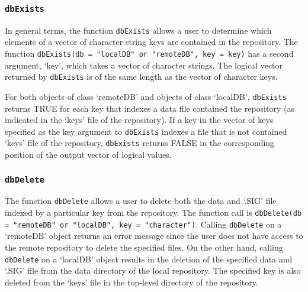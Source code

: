 \documentclass{article}
\newcommand{\code}{\texttt}
\begin{document}
\subsubsection{\code{dbExists}}

In general terms, the function \code{dbExists} allows a user to determine which 
elements of a vector of character string keys are contained in the 
repository. The function \code{dbExists(db = "localDB" or 
"remoteDB", key = key)} has a second argument, `key', which takes
a vector of character strings. The logical vector returned by \code{dbExists}
is of the same length as the vector of character keys.

For both objects of class `remoteDB' and objects of class `localDB', 
\code{dbExists} returns TRUE for each key that indexes a data file contained 
the repository (as indicated in the `keys' file of the repository).
If a key in the vector of keys specified as the key argument to \code{dbExists}
indexes a file that is not contained `keys' file of the repository,
\code{dbExists} returns FALSE in the corresponding position of the output vector
of logical values.


\subsubsection{\code{dbDelete}}

The function \code{dbDelete} allows a user to delete both the data and `.SIG' file
indexed by a particular key from the repository. The function call is 
\code{dbDelete(db = "remoteDB" or "localDB", key = "character")}. 
Calling \code{dbDelete} on a `remoteDB' object returns an error message 
since the user does not have access to the remote repository to delete the 
specified files. On the other hand, calling \code{dbDelete} on a `localDB' 
object results in the deletion of the specified data and `.SIG' file from 
the data directory of the local repository. The specified key is also 
deleted from the `keys' file in the top-level directory of the repository.  
\end{document}
